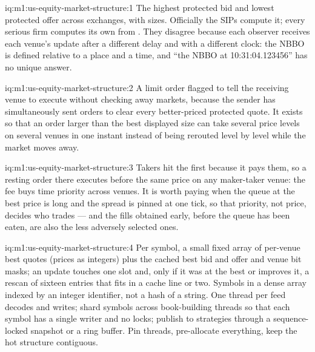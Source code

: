 \begin{solution}{iq:m1:us-equity-market-structure:1}
The highest protected bid and lowest protected offer across exchanges, with
sizes. Officially the SIPs compute it; every serious firm computes its own
from . They disagree because each observer receives each venue's
update after a different delay and with a different clock: the NBBO is
defined relative to a place and a time, and ``the NBBO at 10:31:04.123456''
has no unique answer.
\end{solution}

\begin{solution}{iq:m1:us-equity-market-structure:2}
A limit order flagged to tell the receiving venue to execute without
checking away markets, because the sender has simultaneously sent orders to
clear every better-priced protected quote. It exists so that an order larger
than the best displayed size can take several price levels on several venues
in one instant instead of being rerouted level by level while the market
moves away.
\end{solution}

\begin{solution}{iq:m1:us-equity-market-structure:3}
Takers hit the  first because it pays them, so a resting order
there executes before the same price on any maker-taker venue: the fee buys
time priority across venues. It is worth paying when the queue at the best
price is long and the spread is pinned at one tick, so that priority, not
price, decides who trades --- and the fills obtained early, before the queue
has been eaten, are also the less adversely selected ones.
\end{solution}

\begin{solution}{iq:m1:us-equity-market-structure:4}
Per symbol, a small fixed array of per-venue best quotes (prices as
integers) plus the cached best bid and offer and venue bit masks; an update
touches one slot and, only if it was at the best or improves it, a rescan of
sixteen entries that fits in a cache line or two. Symbols in a dense array
indexed by an integer identifier, not a hash of a string. One thread per feed
decodes and writes; shard symbols across book-building threads so that each
symbol has a single writer and no locks; publish to strategies through a
sequence-locked snapshot or a ring buffer. Pin threads, pre-allocate
everything, keep the hot structure contiguous.
\end{solution}

